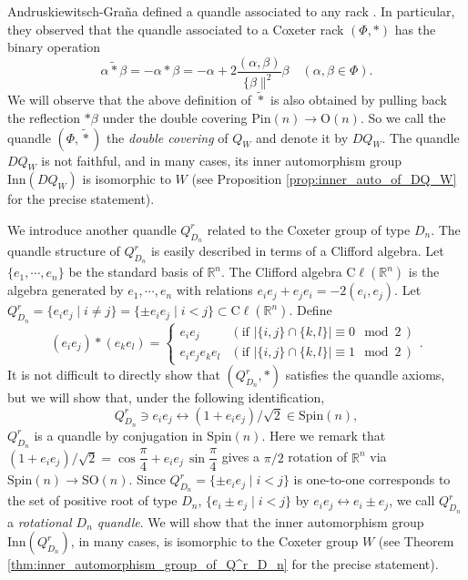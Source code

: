 \documentclass{amsart}
\theoremstyle{definition}
\theoremstyle{remark}
\numberwithin{equation}{section}
\newcommand{\Cl}{\mathrm{C\ell}}
\begin{document}
Andruskiewitsch-Gra\~{n}a defined a quandle associated to any rack
\cite{AG}. 
In particular, they observed that the quandle associated 
to a Coxeter rack $(\Phi, *)$ has the binary operation 
\[
\alpha \widetilde{*} \beta = - \alpha * \beta
= - \alpha + 2 \frac{(\alpha, \beta)}{\{ \beta \|^2} \beta
\quad (\alpha, \beta \in \Phi).
\]
We will observe that 
the above definition of $\widetilde{*}$ is also obtained by pulling back the reflection 
$* \beta$  under the double covering $\mathrm{Pin}(n) \to \mathrm{O}(n)$.
So we call the quandle $(\Phi, \widetilde{*})$ the \emph{double covering} of $Q_W$
and denote it by $DQ_W$. The quandle $DQ_W$ is not faithful, 
and in many cases, its inner automorphism group $\mathrm{Inn}(DQ_{W})$ 
is isomorphic to $W$ 
(see Proposition \ref{prop:inner_auto_of_DQ_W} for the precise statement). 

We introduce another quandle $Q^r_{D_n}$ related to the Coxeter group of type $D_n$.
The quandle structure of $Q^r_{D_n}$ is easily described in terms of a Clifford algebra.
Let $\{ e_1, \cdots, e_n \}$ be the standard basis of $\mathbb{R}^n$.
The Clifford algebra $\Cl (\mathbb{R}^n)$ is the algebra generated by $e_1, \cdots , e_n$ 
with relations $e_i e_j + e_j e_i = - 2(e_i, e_j)$. 
Let $Q^r_{D_n} = \{ e_i e_j \mid i \neq j \} = \{ \pm e_i e_j\mid i < j\} 
\subset \Cl(\mathbb{R}^n)$.
Define
\[
(e_i e_j) * (e_k e_l) 
= \begin{cases} 
e_i e_j & ( \textrm{if $| \{ i, j \} \cap \{ k , l \} | \equiv 0 \mod 2$} \, ) \\
e_i e_j e_k e_l & ( \textrm{if $| \{ i, j \} \cap \{ k , l \} | \equiv 1 \mod 2$} \, )
\end{cases}.
\]
It is not difficult to directly show that $(Q^r_{D_n}, *)$ satisfies the quandle axioms, 
but we will show that, under the following identification, 
\[
Q^r_{D_n} \ni e_i e_j \longleftrightarrow (1 + e_ie_j)/\sqrt{2} \in \mathrm{Spin}(n),
\]
$Q^r_{D_n}$ is a quandle by conjugation in $\mathrm{Spin}(n)$.
Here we remark that 
$(1 + e_ie_j)/\sqrt{2} = \cos \dfrac{\pi}{4} + e_ie_j \, \sin \dfrac{\pi}{4}$ 
gives a $\pi/2$ rotation of $\mathbb{R}^n$ via $\mathrm{Spin}(n) \to \mathrm{SO}(n)$.
Since $Q^r_{D_n} = \{ \pm e_i e_j\mid i < j\}$ 
is one-to-one corresponds to the set of positive root of type $D_n$, 
$\{ e_i \pm e_j \mid i < j \}$ by $e_i e_j \longleftrightarrow e_i \pm e_j$, 
we call $Q^r_{D_n}$ a \emph{rotational $D_n$ quandle}.
We will show that the inner automorphism group $\mathrm{Inn}(Q^r_{D_n})$, 
in many cases, is isomorphic to the Coxeter group $W$
(see Theorem \ref{thm:inner_automorphism_group_of_Q^r_D_n} for the precise statement).
\end{document}
